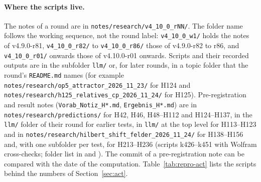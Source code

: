 \paragraph{Where the scripts live.} The notes of a round are in \nolinkurl{notes/research/v4_10_0_rNN/}. The folder name
follows the working sequence, not the round label: \nolinkurl{v4_10_0_w1/} holds the notes of v4.9.0-r81,
\nolinkurl{v4_10_0_r82/} to \nolinkurl{v4_10_0_r86/} those of v4.9.0-r82 to r86, and \nolinkurl{v4_10_0_r01/} onwards those
of v4.10.0-r01 onwards. Scripts and their recorded outputs are in the subfolder \nolinkurl{llm/} or, for later rounds, in a
topic folder that the round's \texttt{README.md} names (for example \nolinkurl{notes/research/op5_attractor_2026_11_23/} for
H124 and \nolinkurl{notes/research/h125_relatives_cp_2026_11_24/} for H125). Pre-registration and result notes
(\nolinkurl{Vorab_Notiz_H*.md}, \nolinkurl{Ergebnis_H*.md}) are in \nolinkurl{notes/research/predictions/} for H42, H46,
H48--H112 and H124--H137, in the \nolinkurl{llm/} folder of their round for earlier tests, in \nolinkurl{llm/} at the top
level for H113--H123 and in \nolinkurl{notes/research/hilbert_shift_felder_2026_11_24/} for H138--H156 and, with one subfolder per test, for H213--H236
(scripts k426--k451 with Wolfram cross-checks; folder list in  and ). The commit of a pre-registration note can be compared with the date of the computation. Table~\ref{tab:repro-act} lists the scripts
behind the numbers of Section~\ref{sec:act}.

